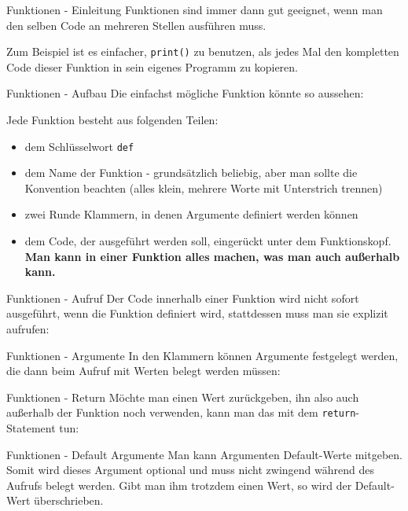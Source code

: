 \begin{frame}{Funktionen - Einleitung}
	Funktionen sind immer dann gut geeignet, wenn man den selben Code an mehreren Stellen ausführen muss.
		
	Zum Beispiel ist es einfacher, \alert{\texttt{print()}} zu benutzen, als jedes Mal den kompletten Code dieser Funktion in sein eigenes Programm zu kopieren.
\end{frame}

\begin{frame}{Funktionen - Aufbau}
	Die einfachst mögliche Funktion könnte so aussehen:
	
	\pause
	Jede Funktion besteht aus folgenden Teilen:
	\pause
	\begin{itemize}
		\item dem Schlüsselwort \alert{\texttt{def}}
		\pause
		\item dem Name der Funktion - grundsätzlich beliebig, aber man sollte  die Konvention beachten (alles klein, mehrere Worte mit Unterstrich trennen)
		\pause
		\item zwei Runde Klammern, in denen Argumente definiert werden können
		\pause
		\item dem Code, der ausgeführt werden soll, eingerückt unter dem Funktionskopf. \textbf{Man kann in einer Funktion alles machen, was man auch außerhalb kann.}
	\end{itemize}
\end{frame}

\begin{frame}{Funktionen - Aufruf}
	Der Code innerhalb einer Funktion wird nicht sofort ausgeführt, wenn die Funktion definiert wird, stattdessen muss man sie explizit aufrufen:
	
\end{frame}

\begin{frame}{Funktionen - Argumente}
	In den Klammern können Argumente festgelegt werden, die dann beim Aufruf mit Werten belegt werden müssen:
	
\end{frame}

\begin{frame}{Funktionen - Return}
	Möchte man einen Wert zurückgeben, ihn also auch außerhalb der Funktion noch verwenden, kann man das mit dem \alert{\texttt{return}}-Statement tun:
	
\end{frame}

\begin{frame}{Funktionen - Default Argumente}
	Man kann Argumenten Default-Werte mitgeben. Somit wird dieses Argument optional und muss nicht zwingend während des Aufrufs belegt werden. Gibt man ihm trotzdem einen Wert, so wird der Default-Wert überschrieben.
\end{frame}


